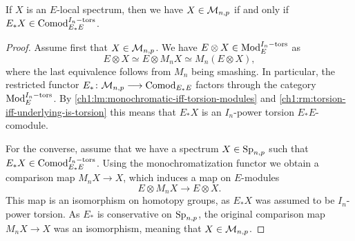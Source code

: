 \begin{lemma}
    \label{ch1:lm:monochromatic-iff-torsion-comodules}
    If $X$ is an $E$-local spectrum, then we have $X\in \mathcal{M}_{n,p}$ if and only if $E_*X\in \mathrm{Comod}_{E_*E}^{I_n-\mathrm{tors}}$. 
\end{lemma}
\begin{proof}
    Assume first that $X\in \mathcal{M}_{n,p}$. We have $E\otimes X\in \mathrm{Mod}_{E}^{I_n-\mathrm{tors}}$ as
    \[E\otimes X\simeq E\otimes M_n X\simeq M_n (E\otimes X),\]
    where the last equivalence follows from $M_n$ being smashing. In particular, the restricted functor $E_*\colon \mathcal{M}_{n,p}\longrightarrow \mathrm{Comod}_{E_*E}$ factors through the category $\mathrm{Mod}_{E}^{I_n-\mathrm{tors}}$. By \cref{ch1:lm:monochromatic-iff-torsion-modules} and \cref{ch1:rm:torsion-iff-underlying-is-torsion} this means that $E_*X$ is an $I_n$-power torsion $E_*E$-comodule. 

    For the converse, assume that we have a spectrum $X\in \mathrm{Sp}_{n,p}$ such that $E_*X\in \mathrm{Comod}_{E_*E}^{I_n-\mathrm{tors}}$. Using the monochromatization functor we obtain a comparison map $M_n X\longrightarrow X$, which induces a map on $E$-modules 
    \[E\otimes M_n X\longrightarrow E\otimes X.\] 
    This map is an isomorphism on homotopy groups, as $E_*X$ was assumed to be $I_n$-power torsion. As $E_*$ is conservative on $\mathrm{Sp}_{n,p}$, the original comparison map $M_n X\longrightarrow X$ was an isomorphism, meaning that $X\in \mathcal{M}_{n,p}$. 
\end{proof}

